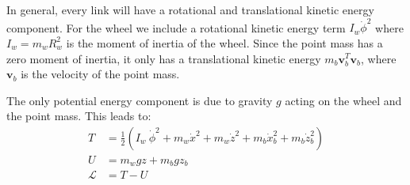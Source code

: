 \documentclass{article}
\newcommand{\vv}{\mathbf{v}}
\begin{document}
In general, every link will have a rotational and translational kinetic energy component. For the wheel we include a rotational kinetic energy term $I_w \dot{\phi}^2$ where $I_w = m_w R_w^2$ is the moment of inertia of the wheel. Since the point mass has a zero moment of inertia, it only has a translational kinetic energy $m_b \vv_b^T \vv_b$, where $\vv_b$ is the velocity of the point mass.

The only potential energy component is due to gravity $g$ acting on the wheel and the point mass. This leads to:
% 
\begin{align} \label{eq:energy1}
    T &= \frac{1}{2}(I_w \ \dot{\phi}^2 + m_w \dot{x}^2 +
        m_w \dot{z}^2 + m_b \dot{x}_b^2 + m_b \dot{z}_b^2) \\
    U &= m_w g z + m_b g z_b \label{eq:energy2} \\
    \mathcal{L} &= T - U \label{eq:energy3}
\end{align}



\end{document}
